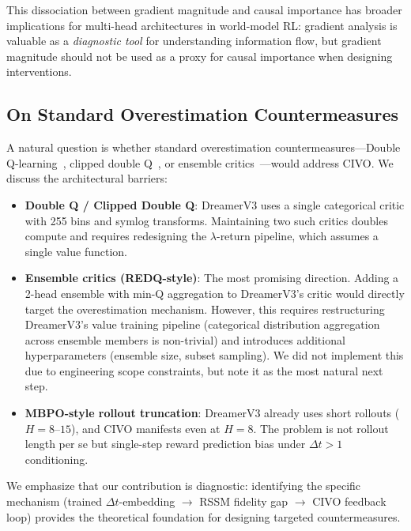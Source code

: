 \documentclass[10pt,letterpaper]{article}
\newcommand{\dt}{\Delta t}
\begin{document}
This dissociation between gradient magnitude and causal importance has broader implications for multi-head architectures in world-model RL: gradient analysis is valuable as a \emph{diagnostic tool} for understanding information flow, but gradient magnitude should not be used as a proxy for causal importance when designing interventions.

\subsection{On Standard Overestimation Countermeasures}
\label{sec:standard_countermeasures}

A natural question is whether standard overestimation countermeasures---Double Q-learning~\citep{hasselt2016deep}, clipped double Q~\citep{fujimoto2018addressing}, or ensemble critics~\citep{chen2021randomized}---would address CIVO. We discuss the architectural barriers:

\begin{itemize}[itemsep=2pt]
    \item \textbf{Double Q / Clipped Double Q}: DreamerV3 uses a single categorical critic with 255 bins and symlog transforms. Maintaining two such critics doubles compute and requires redesigning the $\lambda$-return pipeline, which assumes a single value function.
    \item \textbf{Ensemble critics (REDQ-style)}: The most promising direction. Adding a 2-head ensemble with min-Q aggregation to DreamerV3's critic would directly target the overestimation mechanism. However, this requires restructuring DreamerV3's value training pipeline (categorical distribution aggregation across ensemble members is non-trivial) and introduces additional hyperparameters (ensemble size, subset sampling). We did not implement this due to engineering scope constraints, but note it as the most natural next step.
    \item \textbf{MBPO-style rollout truncation}: DreamerV3 already uses short rollouts ($H = 8$--$15$), and CIVO manifests even at $H = 8$. The problem is not rollout length per se but single-step reward prediction bias under $\dt > 1$ conditioning.
\end{itemize}

We emphasize that our contribution is diagnostic: identifying the specific mechanism (trained $\dt$-embedding $\to$ RSSM fidelity gap $\to$ CIVO feedback loop) provides the theoretical foundation for designing targeted countermeasures.
\end{document}
